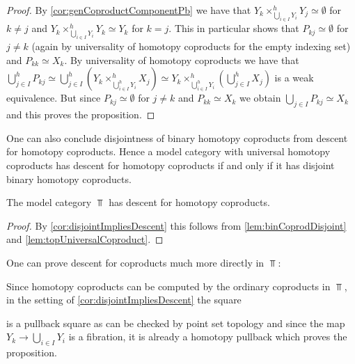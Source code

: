 \begin{corollary}
\begin{proof}
        By \cref{cor:genCoproductComponentPb} we have that $Y_k\times_{\bigcup\limits_{i\in I}Y_i}^h Y_j\simeq\emptyset$ for $k\neq j$ and $Y_k\times_{\bigcup\limits_{i\in I}Y_i}^h Y_k\simeq Y_k$ for $k=j$.
        This in particular shows that $P_{kj}\simeq\emptyset$ for $j\neq k$ (again by universality of homotopy coproducts for the empty indexing set) and $P_{kk}\simeq X_k$.
        By universality of homotopy coproducts we have that $\bigcup\limits_{j\in I}^hP_{kj}\simeq\bigcup\limits_{j\in I}^h\left(Y_k\times_{\bigcup\limits_{i\in I}^hY_i}^hX_j\right)\simeq Y_k\times_{\bigcup\limits_{i\in I}^hY_i}^h\left(\bigcup\limits_{j\in I}^hX_j\right)$ is a weak equivalence.
        But since $P_{kj}\simeq\emptyset$ for $j\neq k$ and $P_{kk}\simeq X_k$ we obtain $\bigcup\limits_{j\in I}P_{kj}\simeq X_k$ and this proves the proposition.
    \end{proof}
\end{corollary}
\begin{remark}
    One can also conclude disjointness of binary homotopy coproducts from descent for homotopy coproducts.
    Hence a model category with universal homotopy coproducts has descent for homotopy coproducts if and only if it has disjoint binary homotopy coproducts.
\end{remark}
\begin{corollary}\label{cor:topDescentCoproduct}
    The model category $\Top$ has descent for homotopy coproducts.
    \begin{proof}
        By \cref{cor:disjointImpliesDescent} this follows from \cref{lem:binCoprodDisjoint} and \cref{lem:topUniversalCoproduct}.
    \end{proof}
\end{corollary}
\begin{remark}
    One can prove descent for coproducts much more directly in $\Top$:
    
    Since homotopy coproducts can be computed by the ordinary coproducts in $\Top$, in the setting of \cref{cor:disjointImpliesDescent} the square
    \begin{center}
    \end{center}
    is a pullback square as can be checked by point set topology and since the map $Y_k\to\bigcup\limits_{i\in I}Y_i$ is a fibration, it is already a homotopy pullback which proves the proposition.
\end{remark}

